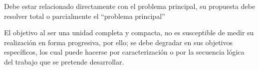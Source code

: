 

Debe estar relacionado directamente con el problema principal, su propuesta debe resolver total o parcialmente el “problema principal” 
\VarObjetivoGeneral\par


El objetivo al ser una unidad completa y compacta, no es susceptible de medir su realización en forma progresiva, por ello; se debe degradar en sus objetivos específicos, los cual puede hacerse por caracterización o por la secuencia lógica del trabajo que se pretende desarrollar.
\VarObjetivosEspecificos\par

